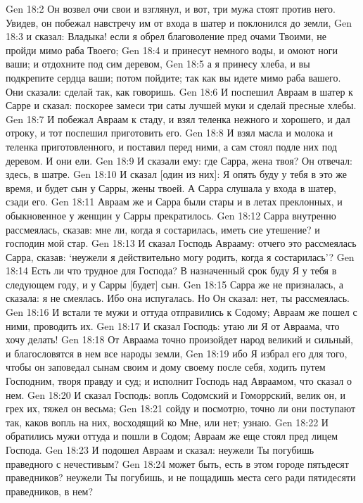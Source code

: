 Gen 18:2  Он возвел очи свои и взглянул, и вот, три мужа стоят против него. Увидев, он побежал навстречу им от входа в шатер и поклонился до земли,
Gen 18:3  и сказал: Владыка! если я обрел благоволение пред очами Твоими, не пройди мимо раба Твоего;
Gen 18:4  и принесут немного воды, и омоют ноги ваши; и отдохните под сим деревом,
Gen 18:5  а я принесу хлеба, и вы подкрепите сердца ваши; потом пойдите; так как вы идете мимо раба вашего. Они сказали: сделай так, как говоришь.
Gen 18:6  И поспешил Авраам в шатер к Сарре и сказал: поскорее замеси три саты лучшей муки и сделай пресные хлебы.
Gen 18:7  И побежал Авраам к стаду, и взял теленка нежного и хорошего, и дал отроку, и тот поспешил приготовить его.
Gen 18:8  И взял масла и молока и теленка приготовленного, и поставил перед ними, а сам стоял подле них под деревом. И они ели.
Gen 18:9  И сказали ему: где Сарра, жена твоя? Он отвечал: здесь, в шатре.
Gen 18:10  И сказал [один из них]: Я опять буду у тебя в это же время, и будет сын у Сарры, жены твоей. А Сарра слушала у входа в шатер, сзади его.
Gen 18:11  Авраам же и Сарра были стары и в летах преклонных, и обыкновенное у женщин у Сарры прекратилось.
Gen 18:12  Сарра внутренно рассмеялась, сказав: мне ли, когда я состарилась, иметь сие утешение? и господин мой стар.
Gen 18:13  И сказал Господь Аврааму: отчего это рассмеялась Сарра, сказав: `неужели я действительно могу родить, когда я состарилась'?
Gen 18:14  Есть ли что трудное для Господа? В назначенный срок буду Я у тебя в следующем году, и у Сарры [будет] сын.
Gen 18:15  Сарра же не призналась, а сказала: я не смеялась. Ибо она испугалась. Но Он сказал: нет, ты рассмеялась.
Gen 18:16  И встали те мужи и оттуда отправились к Содому; Авраам же пошел с ними, проводить их.
Gen 18:17  И сказал Господь: утаю ли Я от Авраама, что хочу делать!
Gen 18:18  От Авраама точно произойдет народ великий и сильный, и благословятся в нем все народы земли,
Gen 18:19  ибо Я избрал его для того, чтобы он заповедал сынам своим и дому своему после себя, ходить путем Господним, творя правду и суд; и исполнит Господь над Авраамом, что сказал о нем.
Gen 18:20  И сказал Господь: вопль Содомский и Гоморрский, велик он, и грех их, тяжел он весьма;
Gen 18:21  сойду и посмотрю, точно ли они поступают так, каков вопль на них, восходящий ко Мне, или нет; узнаю.
Gen 18:22  И обратились мужи оттуда и пошли в Содом; Авраам же еще стоял пред лицем Господа.
Gen 18:23  И подошел Авраам и сказал: неужели Ты погубишь праведного с нечестивым?
Gen 18:24  может быть, есть в этом городе пятьдесят праведников? неужели Ты погубишь, и не пощадишь места сего ради пятидесяти праведников, в нем?
